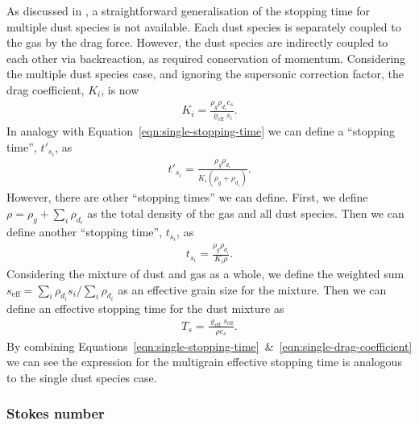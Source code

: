 \documentclass[fleqn,usenatbib]{mnras}
\begin{document}
As discussed in \citet{Hutchison2018MNRAS.476.2186H}, a straightforward
generalisation of the stopping time for multiple dust species is not available.
Each dust species is separately coupled to the gas by the drag force. However,
the dust species are indirectly coupled to each other via backreaction, as
required conservation of momentum. Considering the multiple dust species case,
and ignoring the supersonic correction factor, the drag coefficient, \(K_i\), is
now
%
\begin{align}
   \label{eqn:drag-coefficient}
   K_i = \frac{\rho_g \rho_{d_i} c_s}{\varrho_{\mathrm{eff}} s_i}.
\end{align}
%
In analogy with Equation~\ref{eqn:single-stopping-time} we can define a
``stopping time'', \(t'_{s_i}\), as
%
\begin{align}
   \label{eqn:alternative-stopping-time}
   t'_{s_i} = \frac{\rho_g \rho_{d_i}}{K_i (\rho_g + \rho_{d_i})}.
\end{align}
%
However, there are other ``stopping times'' we can define. First, we define
\(\rho = \rho_g + \sum_i \rho_{d_i}\) as the total density of the gas and all
dust species. Then we can define another ``stopping time'', \(t_{s_i}\), as
%
\begin{align}
   \label{eqn:stopping-time}
   t_{s_i} = \frac{\rho_g \rho_{d_i}}{K_i \rho}.
\end{align}
%
Considering the mixture of dust and gas as a whole, we define the weighted sum
\(s_{\mathrm{eff}} = \sum_i \rho_{d_i} s_i / \sum_i \rho_{d_i}\) as an effective
grain size for the mixture. Then we can define an effective stopping time for
the dust mixture as
%
\begin{align}
   \label{eqn:effective-stopping-time}
   T_s = \frac{\varrho_{\mathrm{eff}} s_{\mathrm{eff}}}{\rho c_s}.
\end{align}
%
By combining
Equations~\ref{eqn:single-stopping-time}~\&~\ref{eqn:single-drag-coefficient} we
can see the expression for the multigrain effective stopping time is analogous
to the single dust species case.

\subsubsection{Stokes number}
\end{document}
